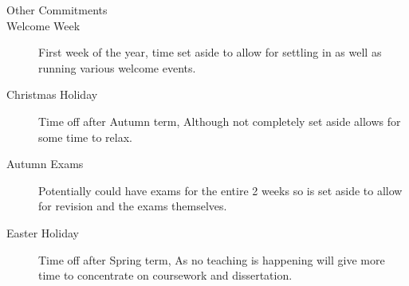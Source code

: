 \documentclass[a4paper]{article}
\begin{document}
\begin{description}
\item [\large{Other Commitments}]
\item [Welcome Week] First week of the year, time set aside to allow for settling in as well as running various welcome events.
\item [Christmas Holiday] Time off after Autumn term, Although not completely set aside allows for some time to relax.
\item [Autumn Exams] Potentially could have exams for the entire 2 weeks so is set aside to allow for revision and the exams themselves.
\item [Easter Holiday] Time off after Spring term, As no teaching is happening will give more time to concentrate on coursework and dissertation.
\end{description}



\end{document}

